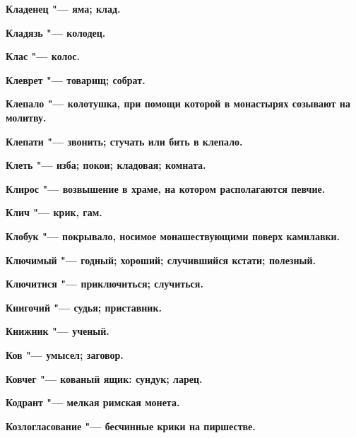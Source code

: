 \bfseries Кладенец \normalfont{} "--- яма; клад. 




\bfseries Кладязь \normalfont{} "--- колодец. 




\bfseries Клас \normalfont{} "--- колос. 




\bfseries Клеврет \normalfont{} "--- товарищ; собрат. 




\bfseries Клепало \normalfont{} "--- колотушка, при помощи которой в монастырях созывают на молитву. 




\bfseries Клепати \normalfont{} "--- звонить; стучать или бить в клепало. 




\bfseries Клеть \normalfont{} "--- изба; покои; кладовая; комната. 




\bfseries Клирос \normalfont{} "--- возвышение в храме, на котором располагаются певчие. 




\bfseries Клич \normalfont{} "--- крик, гам. 




\bfseries Клобук \normalfont{} "--- покрывало, носимое монашествующими поверх камилавки. 




\bfseries Ключимый \normalfont{} "--- годный; хороший; случившийся кстати; полезный. 




\bfseries Ключитися \normalfont{} "--- приключиться; случиться. 




\bfseries Книгочий \normalfont{} "--- судья; приставник. 




\bfseries Книжник \normalfont{} "--- ученый. 




\bfseries Ков \normalfont{} "--- умысел; заговор. 




\bfseries Ковчег \normalfont{} "--- кованый ящик: сундук; ларец. 




\bfseries Кодрант \normalfont{} "--- мелкая римская монета. 




\bfseries Козлогласование \normalfont{} "--- бесчинные крики на пиршестве. 




